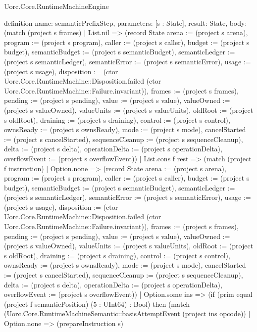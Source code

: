 \begin{lexlean}{Uorc.Core.RuntimeMachineEngine}
\begin{semanticmodule}
definition{
  name: semanticPrefixStep,
  parameters: [s : State],
  result: State,
  body: (match (project s frames)
    | List.nil => (record State {arena := (project s arena), program := (project s program), caller := (project s caller), budget := (project s budget), semanticBudget := (project s semanticBudget), semanticLedger := (project s semanticLedger), semanticError := (project s semanticError), usage := (project s usage), disposition := (ctor Uorc.Core.RuntimeMachine::Disposition.failed (ctor Uorc.Core.RuntimeMachine::Failure.invariant)), frames := (project s frames), pending := (project s pending), value := (project s value), valueOwned := (project s valueOwned), valueUnits := (project s valueUnits), oldRoot := (project s oldRoot), draining := (project s draining), control := (project s control), ownsReady := (project s ownsReady), mode := (project s mode), cancelStarted := (project s cancelStarted), sequenceCleanup := (project s sequenceCleanup), delta := (project s delta), operationDelta := (project s operationDelta), overflowEvent := (project s overflowEvent)})
    | List.cons f rest => (match (project f instruction)
      | Option.none => (record State {arena := (project s arena), program := (project s program), caller := (project s caller), budget := (project s budget), semanticBudget := (project s semanticBudget), semanticLedger := (project s semanticLedger), semanticError := (project s semanticError), usage := (project s usage), disposition := (ctor Uorc.Core.RuntimeMachine::Disposition.failed (ctor Uorc.Core.RuntimeMachine::Failure.invariant)), frames := (project s frames), pending := (project s pending), value := (project s value), valueOwned := (project s valueOwned), valueUnits := (project s valueUnits), oldRoot := (project s oldRoot), draining := (project s draining), control := (project s control), ownsReady := (project s ownsReady), mode := (project s mode), cancelStarted := (project s cancelStarted), sequenceCleanup := (project s sequenceCleanup), delta := (project s delta), operationDelta := (project s operationDelta), overflowEvent := (project s overflowEvent)})
      | Option.some ins => (if (prim equal (project f semanticPosition) (5 : UInt64) : Bool) then (match (Uorc.Core.RuntimeMachineSemantic::basisAttemptEvent (project ins opcode))
        | Option.none => (prepareInstruction s)
}
\end{semanticmodule}
\end{lexlean}
